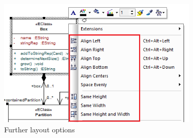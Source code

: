 \begin{enumerate}
\begin{figure}[htbp]
\begin{center}  
  \includegraphics[width=0.85\textwidth]{layoutElements2}
  \caption{Further layout options}  
  \label{ea:layout2} 
\end{center}
\end{figure}

\end{enumerate}
